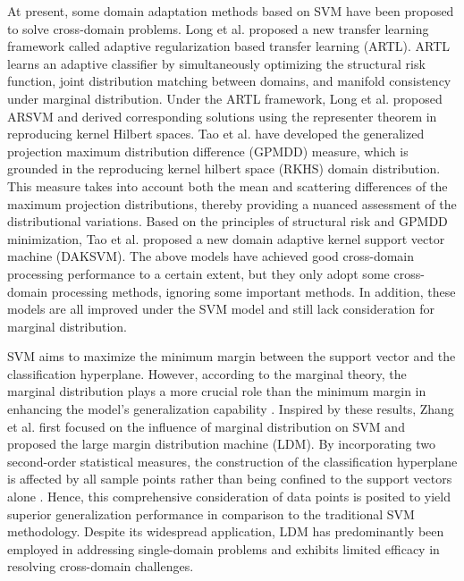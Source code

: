 \documentclass[a4paper]{cas-sc}
\begin{document}
At present, some domain adaptation methods based on SVM have been proposed to solve cross-domain problems. Long et al. \citep{ARTL} proposed a new transfer learning framework called adaptive regularization based transfer learning (ARTL). ARTL learns an adaptive classifier by simultaneously optimizing the structural risk function, joint distribution matching between domains, and manifold consistency under marginal distribution. Under the ARTL framework, Long et al. proposed ARSVM \citep{ARSVM} and derived corresponding solutions using the representer theorem in reproducing kernel Hilbert spaces. 
Tao et al. \citep{TAO20123962} have developed the generalized projection maximum distribution difference (GPMDD) measure, which is grounded in the reproducing kernel hilbert space (RKHS) domain distribution. This measure takes into account both the mean and scattering differences of the maximum projection distributions, thereby providing a nuanced assessment of the distributional variations.
Based on the principles of structural risk and GPMDD minimization, Tao et al. \citep{TAO20123962} proposed a new domain adaptive kernel support vector machine (DAKSVM). The above models have achieved good cross-domain processing performance to a certain extent, but they only adopt some cross-domain processing methods, ignoring some important methods. In addition, these models are all improved under the SVM model and still lack consideration for marginal distribution.

SVM aims to maximize the minimum margin between the support vector and the classification hyperplane\citep{Reyzin,zhang2018optimal,9225727}. However, according to the marginal theory, the marginal distribution plays a more crucial role than the minimum margin in enhancing the model's generalization capability \citep{GAO20131,wang2011refined}.
Inspired by these results, Zhang et al. \cite{LDM} first focused on the influence of marginal distribution on SVM and proposed the large margin distribution machine (LDM). By incorporating two second-order statistical measures, the construction of the classification hyperplane is affected by all sample points rather than being confined to the support vectors alone \citep{stephan}. Hence, this comprehensive consideration of data points is posited to yield superior generalization performance in comparison to the traditional SVM methodology.
Despite its widespread application, LDM has predominantly been employed in addressing single-domain problems and exhibits limited efficacy in resolving cross-domain challenges.
\end{document}

